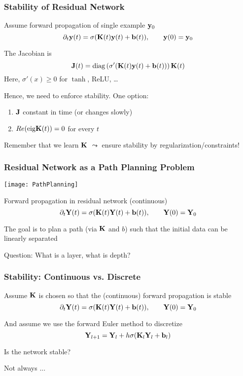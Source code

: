 \documentclass[12pt,fleqn,handout]{beamer}
\begin{document}
\begin{frame}
	\frametitle{Stability of Residual Network}
	
	Assume forward propagation of single example ${\bf y}_0$
	$$ \partial_t{{\bf y}}(t) = \sigma({\bf K}(t) {\bf y}(t) + {\bf b}(t)), \quad \quad {\bf y}(0) = {\bf y}_0 $$
	
	\bigskip
	\pause
	
	The Jacobian is
	$$
	 {\bf J}(t) = {\rm diag}\left(\sigma'({\bf K}(t) {\bf y}(t) + {\bf b}(t))\right) {\bf K}(t)
	$$
	Here, $\sigma'(x) \geq 0$ for $\tanh$, ReLU, \ldots
	
	\bigskip
	\pause
	
	Hence, we need to enforce stability. One option:
	\begin{enumerate}
		\item ${\bf J}$ constant in time  (or changes slowly)
		\item $Re({\rm eig}{\bf K}(t))= 0$ for every $t$
	\end{enumerate}
	
	
	\pause
	
	\begin{center}
		Remember that we  learn ${\bf K}$ $\leadsto$ ensure stability by regularization/constraints!
	\end{center}
	
	
\end{frame}


\begin{frame}\frametitle{Residual Network as a Path Planning Problem}


\begin{center}
	\texttt{[image: PathPlanning]}
\end{center}

\bigskip
\pause

Forward propagation in residual network (continuous)
$$ \partial_t {\bf Y}(t) = \sigma( {\bf K}(t) {\bf Y}(t) + {\bf b}(t)), \qquad {\bf Y}(0) = {\bf Y}_0 $$

The goal is to plan a path (via ${\bf K}$ and $b$) such that the initial data can be linearly separated

\bigskip
\pause
Question: What is a layer, what is depth?


\end{frame}




\begin{frame}\frametitle{Stability: Continuous vs. Discrete}


Assume ${\bf K}$ is chosen so that the (continuous) forward propagation is stable
$$ \partial_t {\bf Y}(t) = \sigma( {\bf K}(t) {\bf Y}(t)+ {\bf b}(t)), \qquad {\bf Y}(0) = {\bf Y}_0 $$

And assume we use the forward Euler method to discretize
$$ {\bf Y}_{l+1} = {\bf Y}_{l} + h \sigma( {\bf K}_l {\bf Y}_l + {\bf b}_l) $$

Is the network stable?


\bigskip
\pause

Not always ...


\end{frame}
\end{document}
